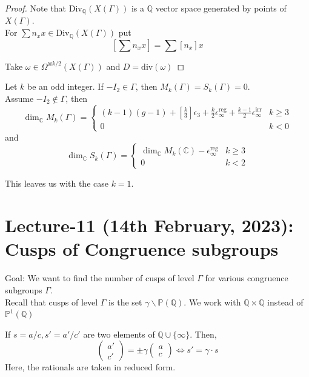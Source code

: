 \documentclass[oneside, 12pt]{scrbook}
\newcommand{\CC}{\mathbb C}
\newcommand{\QQ}{\mathbb Q}
\newcommand{\PP}{\mathbb{P}}
\newcommand{\bs}{\backslash}
\theoremstyle{theorem}
\begin{document}
\begin{proof}
Note that $\mathrm{Div}_{\QQ}(X(\Gamma))$ is a $\QQ$ vector space generated by points of $X(\Gamma)$. \\

For $\sum n_{x} x \in \mathrm{Div}_{\QQ}(X(\Gamma))$ put 
\begin{equation}
\left[ \sum n_{x} x \right]  = \sum [n_{x}]x
\end{equation}

Take $\omega \in \Omega^{\otimes k/2} (X(\Gamma))$ and $D = \mathrm{div}(\omega)$
\end{proof}

\begin{theorem}
Let $k$ be an odd integer. If $-I_{2} \in \Gamma$, then $M_{k}(\Gamma) = S_{k}(\Gamma)=0$. \\

Assume $-I_{2} \not \in \Gamma$, then 
\begin{equation}
\dim_{\CC} M_{k}(\Gamma) = \begin{cases} (k-1)(g-1) + \left[ \frac{k}{3} \right] \epsilon_{3} + \frac{k}{2} \epsilon_{\infty}^{\mathrm{reg}} + \frac{k-1}{2} \epsilon_{\infty}^{\mathrm{irr}} & k \geq 3 \\ 0 & k<0 \end{cases}
\end{equation} 
and 
\begin{equation}
\dim_{\CC}S_{k}(\Gamma) = \begin{cases} \dim_{\CC} M_{k}(\CC) - \epsilon^{\mathrm{reg}}_{\infty}  & k \geq 3 \\ 0 & k <2  \end{cases}
\end{equation}
\end{theorem}

This leaves us with the case $k=1$.

\chapter{Lecture-11 (14th February, 2023): Cusps of Congruence subgroups}

\textcolor{BrickRed}{Goal}: We want to find the number of cusps of level $\Gamma$ for various congruence subgroups $\Gamma$. \\

Recall that cusps of level $\Gamma$ is the set $\gamma \bs \PP(\QQ)$. We work with $\QQ \times \QQ$ instead of $\PP^{1}(\QQ)$

\begin{lemma}
If $s=a/c , s'=a'/c'$ are two elements of $\QQ \cup \{\infty \}$. Then, $$\begin{pmatrix}
a' \\ c' 
\end{pmatrix} = \pm \gamma \begin{pmatrix}
a \\ c
\end{pmatrix} \Leftrightarrow  s' = \gamma \cdot s$$
Here, the rationals are taken in reduced form.
\end{lemma}
\end{document}
